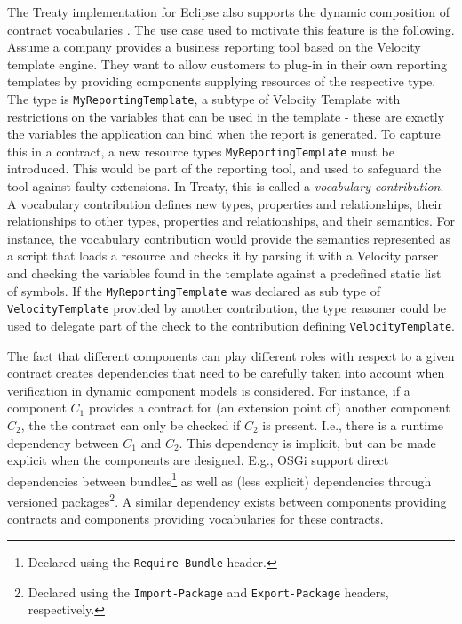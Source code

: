 \documentclass{llncs}
\begin{document}
The Treaty implementation for Eclipse also supports the dynamic composition of contract vocabularies \cite{Treaty.JOT2009}. The use case used to motivate this feature is the following. Assume a company provides a business reporting tool based on the Velocity template engine. They want to allow customers to plug-in in their own reporting templates by providing components supplying resources of the respective type. The type is \texttt{MyReportingTemplate}, a subtype of Velocity Template with restrictions on the variables that can be used in the template - these are exactly the variables the application can bind when the report is generated. To capture this  in a contract, a new resource types \texttt{MyReportingTemplate} must be introduced. This would be part of the reporting tool, and used to safeguard the tool against faulty extensions.  In Treaty, this is called a \textit{vocabulary contribution}. A vocabulary contribution defines new types, properties and relationships, their relationships to other types, properties and relationships, and their semantics. For instance, the vocabulary contribution would provide the semantics represented as a script that loads a resource and checks it by parsing it with a Velocity parser and checking the variables found in the template against a predefined static list of symbols. If the \texttt{MyReportingTemplate} was declared as sub type of \texttt{VelocityTemplate} provided by another contribution, the type reasoner could be used to delegate part of the check to the contribution defining \texttt{VelocityTemplate}. 

The fact that different components can play different roles with respect to a given contract creates dependencies that need to be carefully taken into account when verification in dynamic component models is considered. For instance, if a component $C_1$ provides a contract for (an extension point of) another component $C_2$, the the contract  can only be checked if $C_2$ is present. I.e., there is a runtime dependency between $C_1$ and $C_2$. This dependency is implicit,
but can be made explicit when the components are designed. E.g., OSGi support direct dependencies between bundles\footnote{Declared using the \texttt{Require-Bundle} header.} as well as (less explicit) dependencies through versioned packages\footnote{Declared using the \texttt{Import-Package} and \texttt{Export-Package} headers, respectively.}. A similar dependency exists between components providing contracts and components providing vocabularies for these contracts. 
 
\end{document}
